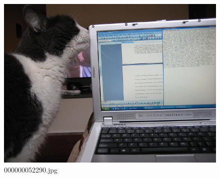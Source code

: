     \begin{figure}[h]
        \centering
        \includegraphics[width=0.8\linewidth]{../image set/easy/000000052290.jpg}
        \caption{000000052290.jpg}
    \end{figure}

